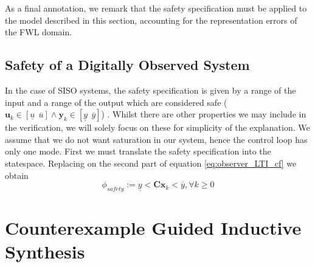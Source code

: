 \documentclass[sigconf]{llncs}
\newcommand{\mat}[1]{\boldsymbol{#1}}
\renewcommand{\vec}[1]{\boldsymbol{#1}}
\begin{document}
As a final annotation, we remark that the safety specification must be
applied to the model described in this section, accounting for the
representation errors of the FWL domain.

\subsection{Safety of a Digitally Observed System}\label{sec:cof_safety}

In the case of SISO systems, the safety specification is
given by a range of the input and a range of the output which are considered
safe ($\vec{u}_k \in [\underline{u}\ \ \overline{u}] \wedge \vec{y}_k \in
[\underline{y}\ \ \overline{y}]$)
.
Whilst there are other properties we may
include in the verification, we will solely focus on these for simplicity of
the explanation.  We assume that we do not want saturation in our
system, hence the control loop has only one mode.
First we must
translate the safety specification into the statespace.  Replacing on the
second part of equation \eqref{eq:observer_LTI_cf} we obtain
%
\begin{equation}
\phi_{safety} := \underline{y}<\mat{C}\vec{x}_k<\overline{y}, \forall k \geq 0
\label{eq:of_bounds}
\end{equation}
%
%

\section{Counterexample Guided Inductive Synthesis} 
\label{ssec:cegis}
\end{document}
